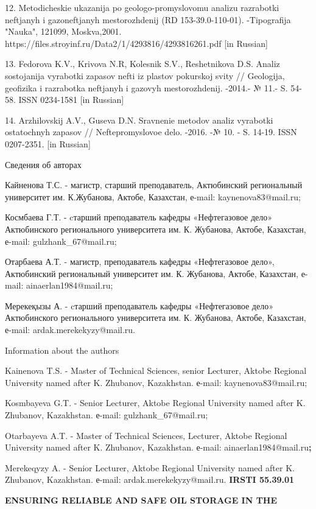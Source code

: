 12. Metodicheskie ukazanija po geologo-promyslovomu analizu razrabotki
neftjanyh i gazoneftjanyh mestorozhdenij (RD 153-39.0-110-01).
-Tipografija "Nauka", 121099, Moskva,2001.
https://files.stroyinf.ru/Data2/1/4293816/4293816261.pdf {[}in
Russian{]}

13. Fedorova K.V., Krivova N.R, Kolesnik S.V., Reshetnikova D.S. Analiz
sostojanija vyrabotki zapasov nefti iz plastov pokurskoj svity //
Geologija, geofizika i razrabotka neftjanyh i gazovyh mestorozhdenij.
-2014.- № 11.- S. 54-58. ISSN 0234-1581 {[}in Russian{]}

14. Arzhilovskij A.V., Guseva D.N. Sravnenie metodov analiz vyrabotki
ostatochnyh zapasov // Neftepromyslovoe delo. -2016. -№ 10. - S. 14-19.
ISSN 0207-2351. {[}in Russian{]}

Сведения об авторах

Кайненова Т.С. - магистр, старший преподаватель, Актюбинский
региональный университет им. К.Жубанова, Актобе, Казахстан, е-mail:
kaynenova83@mail.ru;

Космбаева Г.Т. - cтарший преподаватель кафедры «Нефтегазовое дело»
Актюбинского регионального университета им. К. Жубанова, Актобе,
Казахстан, е-mail: gulzhank\_67@mail.ru;

Отарбаева А.Т. - магистр, преподаватель кафедры «Нефтегазовое дело»,
Актюбинский региональный университет им. К. Жубанова, Актобе, Казахстан,
е-mail: ainaerlan1984@mail.ru;

Мерекеқызы А. - cтарший преподаватель кафедры «Нефтегазовое дело»
Актюбинского регионального университета им. К. Жубанова, Актобе,
Казахстан, е-mail: ardak.merekekyzy@mail.ru.

Information about the authors

Kainenova T.S. - Master of Technical Sciences, senior Lecturer, Aktobe
Regional University named after K. Zhubanov, Kazakhstan. е-mail:
kaynenova83@mail.ru;

Kosmbayeva G.T. - Senior Lecturer, Aktobe Regional University named
after K. Zhubanov, Kazakhstan. е-mail: gulzhank\_67@mail.ru;

Otarbayeva A.T. - Master of Technical Sciences, Lecturer, Aktobe
Regional University named after K. Zhubanov, Kazakhstan. е-mail:
ainaerlan1984@mail.ru{\bfseries ;}

Merekeqyzy A. - Senior Lecturer, Aktobe Regional University named after
K. Zhubanov, Kazakhstan. е-mail: ardak.merekekyzy@mail.ru.\newpage
{\bfseries IRSTI 55.39.01}

{\bfseries ENSURING RELIABLE AND SAFE OIL STORAGE IN THE}


